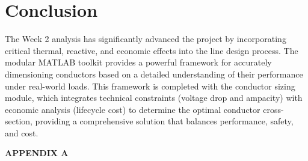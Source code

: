 \documentclass[12pt, a4paper]{article}
\begin{document}
\section{Conclusion}
The Week 2 analysis has significantly advanced the project by incorporating critical thermal, reactive, and economic effects into the line design process. The modular MATLAB toolkit provides a powerful framework for accurately dimensioning conductors based on a detailed understanding of their performance under real-world loads. This framework is completed with the conductor sizing module, which integrates technical constraints (voltage drop and ampacity) with economic analysis (lifecycle cost) to determine the optimal conductor cross-section, providing a comprehensive solution that balances performance, safety, and cost.

\newpage
\appendix

\begin{center}\textbf{APPENDIX A}\end{center}
\end{document}
